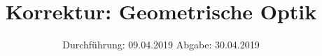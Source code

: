 

\subject{V408}
\title{Korrektur: Geometrische Optik}
\date{
  Durchführung: 09.04.2019
  \hspace{3em}
  Abgabe: 30.04.2019
}



\maketitle
\thispagestyle{empty}
\tableofcontents
\newpage

%







\printbibliography

